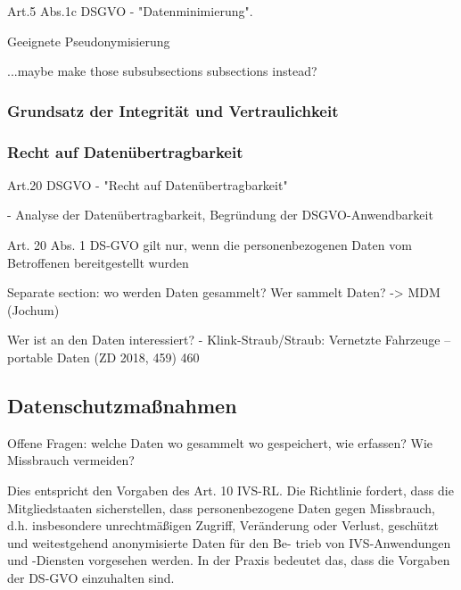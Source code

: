 Art.5 Abs.1c DSGVO - "Datenminimierung". 

Geeignete Pseudonymisierung

...maybe make those subsubsections subsections instead?

\subsubsection{Grundsatz der Integrität und Vertraulichkeit}



\subsubsection{Recht auf Datenübertragbarkeit}

Art.20 DSGVO - "Recht auf Datenübertragbarkeit"

\cite{Straub2018} - Analyse der Datenübertragbarkeit, Begründung der DSGVO-Anwendbarkeit

Art. 20 Abs. 1 DS-GVO gilt nur, wenn die personenbezogenen Daten vom Betroffenen bereitgestellt wurden

Separate section: wo werden Daten gesammelt? Wer sammelt Daten? 
-> MDM (Jochum)

Wer ist an den Daten interessiert? - Klink-Straub/Straub: Vernetzte Fahrzeuge – portable Daten (ZD 2018, 459) 460


\subsection{Datenschutzmaßnahmen}

Offene Fragen: welche Daten wo gesammelt wo gespeichert, wie erfassen? Wie Missbrauch vermeiden?

Dies entspricht den Vorgaben des Art. 10 IVS-RL. Die Richtlinie fordert, dass die Mitgliedstaaten sicherstellen, dass personenbezogene Daten gegen Missbrauch, d.h. insbesondere unrechtmäßigen Zugriff, Veränderung oder Verlust, geschützt und weitestgehend anonymisierte Daten für den Be- trieb von IVS-Anwendungen und -Diensten vorgesehen werden. In der Praxis bedeutet das, dass die Vorgaben der DS-GVO einzuhalten sind. 

